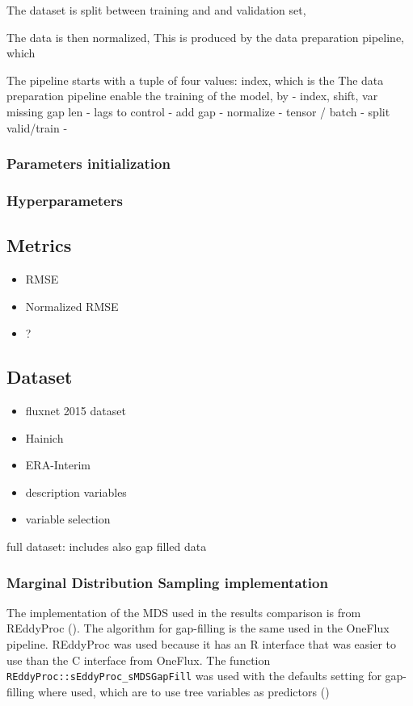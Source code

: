 \documentclass{article}
\let\Oldsubsection\subsection
\renewcommand{\subsection}{\FloatBarrier\Oldsubsection}
\let\Oldsubsubsection\subsubsection
\renewcommand{\subsubsection}{\FloatBarrier\Oldsubsubsection}
\begin{document}
The dataset is split between training and and validation set, 

The data is then normalized, 
This is produced by the data preparation pipeline, which 

The pipeline starts with a tuple of four values: index, which is the 
The data preparation pipeline enable the training of the model, by 
- index, shift, var missing gap len
- lags to control
- add gap
- normalize
- tensor / batch
- split valid/train
- 

\subsubsection{Parameters initialization}

\subsubsection{Hyperparameters}

\subsection{Metrics}

\begin{itemize}
    \item RMSE
    \item Normalized RMSE
    \item ?
\end{itemize}

\subsection{Dataset}

\begin{itemize}
    \item fluxnet 2015 dataset
    \item Hainich
    \item ERA-Interim
    \item description variables
\item variable selection
\end{itemize}

full dataset: includes also gap filled data

\subsubsection{Marginal Distribution Sampling implementation}

The implementation of the MDS used in the results comparison is from REddyProc (\cite{wutzler_basic_2018}). The algorithm for gap-filling is the same used in the OneFlux pipeline. REddyProc was used because it has an R interface that was easier to use than the C interface from OneFlux.
The function \verb|REddyProc::sEddyProc_sMDSGapFill| was used with the defaults setting for gap-filling where used, which are to use tree variables as predictors ()
\end{document}
